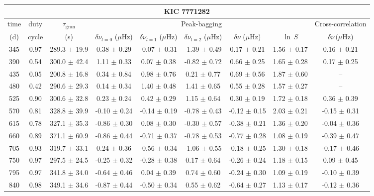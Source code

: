 \documentclass[twocolumn]{aastex61}%
\begin{document}
\FloatBarrier
\nopagebreak
\begin{table}[ht]\centering\fontsize{9.}{7.}\selectfont
\begin{tabular}{ccc|ccccc|c}
\multicolumn{9}{c}{KIC 7771282}\\ \hline\hline
time & duty & $\tau_\text{gran}$ &\multicolumn{5}{c|}{Peak-bagging}&Cross-correlation\\
(d)& cycle & (s)&$\delta\nu_{l=0}$ ($\mu$Hz) & $\delta\nu_{l=1}$ ($\mu$Hz) & $\delta\nu_{l=2}$ ($\mu$Hz) & $\delta\nu$ ($\mu$Hz)& $\ln\,S$ & $\delta\nu\,(\mu$Hz)\\\hline
345 & 0.97 & 289.3 $\pm$ 19.9 & 0.38 $\pm$ 0.29 & -0.07 $\pm$ 0.31 & -1.39 $\pm$ 0.49 & 0.17 $\pm$ 0.21 & 1.56 $\pm$ 0.17 & 0.16 $\pm$ 0.21\\
390 & 0.54 & 300.0 $\pm$ 42.4 & 1.11 $\pm$ 0.33 & 0.07 $\pm$ 0.38 & -0.82 $\pm$ 0.72 & 0.66 $\pm$ 0.25 & 1.65 $\pm$ 0.28 & 0.17 $\pm$ 0.25\\
435 & 0.05 & 200.8 $\pm$ 16.8 & 0.34 $\pm$ 0.84 & 0.98 $\pm$ 0.76 & 0.21 $\pm$ 0.77 & 0.69 $\pm$ 0.56 & 1.87 $\pm$ 0.60 & --\\
480 & 0.42 & 290.6 $\pm$ 29.3 & 0.14 $\pm$ 0.34 & 1.40 $\pm$ 0.48 & 1.41 $\pm$ 0.65 & 0.55 $\pm$ 0.28 & 1.57 $\pm$ 0.27 & --\\
525 & 0.90 & 300.6 $\pm$ 32.8 & 0.23 $\pm$ 0.24 & 0.42 $\pm$ 0.29 & 1.15 $\pm$ 0.64 & 0.30 $\pm$ 0.19 & 1.72 $\pm$ 0.18 & 0.36 $\pm$ 0.39\\
570 & 0.81 & 328.8 $\pm$ 39.9 & -0.10 $\pm$ 0.24 & -0.14 $\pm$ 0.19 & -0.78 $\pm$ 0.43 & -0.12 $\pm$ 0.15 & 2.03 $\pm$ 0.21 & -0.15 $\pm$ 0.31\\
615 & 0.78 & 327.1 $\pm$ 35.3 & -0.86 $\pm$ 0.30 & 0.08 $\pm$ 0.30 & -0.30 $\pm$ 0.57 & -0.38 $\pm$ 0.21 & 1.36 $\pm$ 0.20 & -0.04 $\pm$ 0.36\\
660 & 0.89 & 371.1 $\pm$ 60.9 & -0.86 $\pm$ 0.44 & -0.71 $\pm$ 0.37 & -0.78 $\pm$ 0.53 & -0.77 $\pm$ 0.28 & 1.08 $\pm$ 0.19 & -0.39 $\pm$ 0.47\\
705 & 0.93 & 319.7 $\pm$ 33.1 & 0.24 $\pm$ 0.36 & -0.56 $\pm$ 0.34 & -1.06 $\pm$ 0.55 & -0.18 $\pm$ 0.25 & 1.30 $\pm$ 0.18 & -0.17 $\pm$ 0.46\\
750 & 0.97 & 297.5 $\pm$ 24.5 & -0.25 $\pm$ 0.32 & -0.28 $\pm$ 0.38 & 0.17 $\pm$ 0.64 & -0.26 $\pm$ 0.24 & 1.18 $\pm$ 0.15 & 0.09 $\pm$ 0.45\\
795 & 0.97 & 341.8 $\pm$ 34.0 & -0.64 $\pm$ 0.46 & 0.04 $\pm$ 0.39 & 0.74 $\pm$ 0.60 & -0.24 $\pm$ 0.30 & 1.09 $\pm$ 0.19 & -0.10 $\pm$ 0.39\\
840 & 0.98 & 349.1 $\pm$ 34.6 & -0.87 $\pm$ 0.44 & -0.50 $\pm$ 0.34 & 0.55 $\pm$ 0.62 & -0.64 $\pm$ 0.27 & 1.13 $\pm$ 0.17 & -0.12 $\pm$ 0.36\\

\end{tabular}
\end{table}
\end{document}
